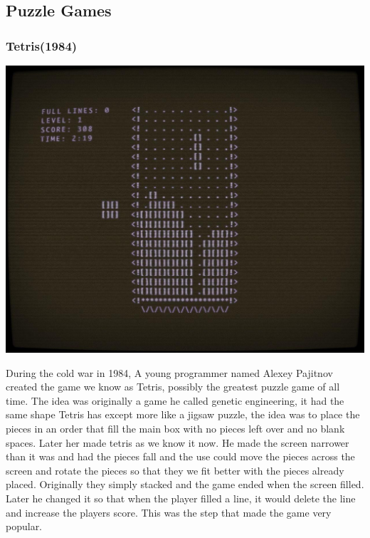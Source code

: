 \documentclass{article}
\begin{document}
\subsection{Puzzle Games}

\subsubsection{Tetris(1984)}
\begin{minipage}{0.43\textwidth}
\includegraphics[width=\linewidth]{tetris}
\end{minipage} \hfill
\begin{minipage}{0.55\textwidth}\raggedright
During the cold war in 1984, A young programmer named Alexey Pajitnov created the game we know as Tetris, possibly the greatest puzzle game of all time. The idea was originally a game he called genetic engineering, it had the same shape Tetris has except more like a jigsaw puzzle, the idea was to place the pieces in an order that fill the main box with no pieces left over and no blank spaces. Later her made tetris as we know it now. He made the screen narrower than it was and had the pieces fall and the use could move the pieces across the screen and rotate the pieces so that they we fit better with the pieces already placed. Originally they simply stacked and the game ended when the screen filled. Later he changed it so that when the player filled a line, it would delete the line and increase the players score. This was the step that made the game very popular. \newline
\end{minipage}
\end{document}

